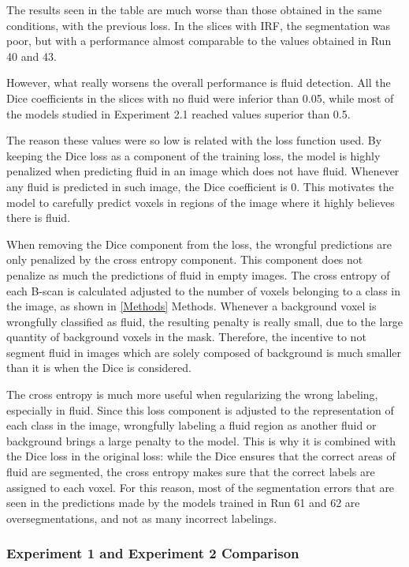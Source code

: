 The results seen in the table are much worse than those obtained in the same conditions, with the previous loss. In the slices with IRF, the segmentation was poor, but with a performance almost comparable to the values obtained in Run 40 and 43.
\par
However, what really worsens the overall performance is fluid detection. All the Dice coefficients in the slices with no fluid were inferior than 0.05, while most of the models studied in Experiment 2.1 reached values superior than 0.5.
\par
The reason these values were so low is related with the loss function used. By keeping the Dice loss as a component of the training loss, the model is highly penalized when predicting fluid in an image which does not have fluid. Whenever any fluid is predicted in such image, the Dice coefficient is 0. This motivates the model to carefully predict voxels in regions of the image where it highly believes there is fluid.
\par
When removing the Dice component from the loss, the wrongful predictions are only penalized by the cross entropy component. This component does not penalize as much the predictions of fluid in empty images. The cross entropy of each B-scan is calculated adjusted to the number of voxels belonging to a class in the image, as shown in \ref{Methods} Methods. Whenever a background voxel is wrongfully classified as fluid, the resulting penalty is really small, due to the large quantity of background voxels in the mask. Therefore, the incentive to not segment fluid in images which are solely composed of background is much smaller than it is when the Dice is considered. 
\par
The cross entropy is much more useful when regularizing the wrong labeling, especially in fluid. Since this loss component is adjusted to the representation of each class in the image, wrongfully labeling a fluid region as another fluid or background brings a large penalty to the model. This is why it is combined with the Dice loss in the original loss: while the Dice ensures that the correct areas of fluid are segmented, the cross entropy makes sure that the correct labels are assigned to each voxel. For this reason, most of the segmentation errors that are seen in the predictions made by the models trained in Run 61 and 62 are oversegmentations, and not as many incorrect labelings.

\subsubsection{Experiment 1 and Experiment 2 Comparison}

